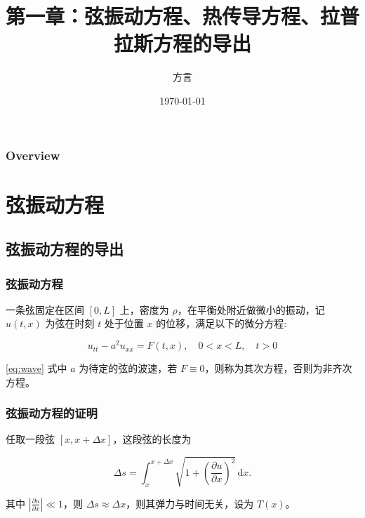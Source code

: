 \documentclass{beamer}
\title[第一章]{第一章：弦振动方程、热传导方程、拉普拉斯方程的导出}
\author{方言} %
\institute[SJTU] %
{
	上海交通大学 \\ %
	\medskip
	\textit{fangyan\_pj@sjtu.edu.cn} %
}
\date{\today} %
\begin{document}
\begin{frame}[allowframebreaks]
	\titlepage %
\end{frame}

\begin{frame}[allowframebreaks]%
	\frametitle{Overview} %
	\tableofcontents
\end{frame}


\section{弦振动方程} %
\subsection{弦振动方程的导出} %

\begin{frame}[allowframebreaks]
	\frametitle{弦振动方程}
	一条弦固定在区间 $[0,L]$ 上，密度为 $\rho$，在平衡处附近做微小的振动，记 $u(t,x)$ 为弦在时刻 $t$ 处于位置 $x$ 的位移，满足以下的微分方程:

	\begin{equation}
		\label{eq:wave}
		u_{tt} -a^2u_{xx}=F(t,x), \quad 0 < x < L, \quad t > 0
	\end{equation}

	\eqref{eq:wave} 式中 $a$ 为待定的弦的波速，若 $F\equiv 0$，则称为其次方程，否则为非齐次方程。

\end{frame}

\begin{frame}[allowframebreaks]
	\frametitle{弦振动方程的证明}
	任取一段弦 $[x,x+\Delta x]$，这段弦的长度为

	$$
		\Delta s = \int_x^{x+\Delta x}\sqrt{1+\left(\frac{\partial u}{\partial x}\right)^2}\,\mathrm{d}x.
	$$

	其中 $\left\vert\frac{\partial u}{\partial x}\right\vert\ll 1$，则 $\Delta s \approx \Delta x$，则其弹力与时间无关，设为 $T(x)$。

\end{frame}
\end{document}
